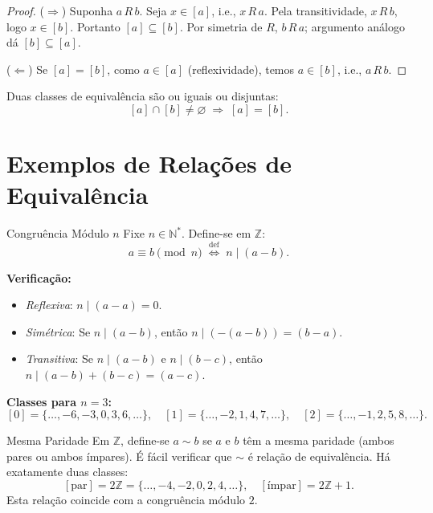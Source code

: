 \documentclass[12pt,a4paper]{book}
\begin{document}
\begin{proof}
($\Rightarrow$) Suponha $a\,R\,b$. Seja $x \in [a]$, i.e., $x\,R\,a$. Pela transitividade, $x\,R\,b$, logo $x \in [b]$. Portanto $[a] \subseteq [b]$. Por simetria de $R$, $b\,R\,a$; argumento análogo dá $[b] \subseteq [a]$.

\smallskip
($\Leftarrow$) Se $[a] = [b]$, como $a \in [a]$ (reflexividade), temos $a \in [b]$, i.e., $a\,R\,b$.
\end{proof}

\begin{corolario}{}{}
Duas classes de equivalência são ou iguais ou disjuntas:
\[
  [a] \cap [b] \neq \varnothing \;\Longrightarrow\; [a] = [b].
\]
\end{corolario}

\section{Exemplos de Relações de Equivalência}

\begin{exemplo}{Congruência Módulo $n$}{}
Fixe $n \in \mathbb{N}^*$. Define-se em $\mathbb{Z}$:
\[
  a \equiv b \pmod{n} \;\stackrel{\text{def}}{\Longleftrightarrow}\; n \mid (a - b).
\]

\textbf{Verificação:}
\begin{itemize}
  \item \emph{Reflexiva}: $n \mid (a - a) = 0$. \checkmark
  \item \emph{Simétrica}: Se $n \mid (a-b)$, então $n \mid (-(a-b)) = (b-a)$. \checkmark
  \item \emph{Transitiva}: Se $n \mid (a-b)$ e $n \mid (b-c)$, então $n \mid (a-b)+(b-c) = (a-c)$. \checkmark
\end{itemize}

\textbf{Classes para $n=3$:}
\[
  [0] = \{\dots,-6,-3,0,3,6,\dots\},\quad [1]=\{\dots,-2,1,4,7,\dots\},\quad [2]=\{\dots,-1,2,5,8,\dots\}.
\]
\end{exemplo}

\begin{exemplo}{Mesma Paridade}{}
Em $\mathbb{Z}$, define-se $a \sim b$ se $a$ e $b$ têm a mesma paridade (ambos pares ou ambos ímpares). É fácil verificar que $\sim$ é relação de equivalência. Há exatamente duas classes:
\[
  [\text{par}] = 2\mathbb{Z} = \{\dots,-4,-2,0,2,4,\dots\},\quad [\text{ímpar}] = 2\mathbb{Z}+1.
\]
Esta relação coincide com a congruência módulo $2$.
\end{exemplo}
\end{document}
